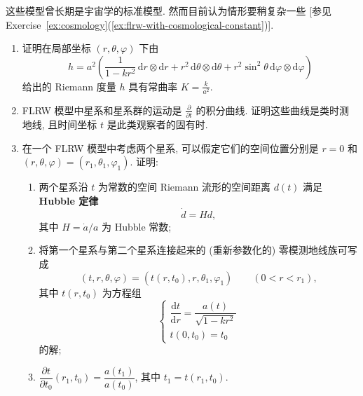这些模型曾长期是宇宙学的标准模型. 然而目前认为情形要稍复杂一些 [参见 Exercise~\ref{ex:cosmology}(\ref{ex:flrw-with-cosmological-constant})].

\begin{RiemannExercise}\label{ex:cosmology}
\begin{enumerate}[label=(\arabic*),ref=\arabic*,leftmargin=*]
\item\label{ex:constant-curvature-of-flrw-spatial-metric}
证明在局部坐标 $(r,\theta,\varphi)$ 下由
\[
  h=a^2\left(\frac{1}{1-kr^2}\,\mathrm{d}r\otimes\mathrm{d}r
     +r^2\,\mathrm{d}\theta\otimes\mathrm{d}\theta
     +r^2\sin^2\theta\,\mathrm{d}\varphi\otimes\mathrm{d}\varphi\right)
\]
给出的 Riemann 度量 $h$ 具有常曲率 $K=\frac{k}{a^2}$.
\item\label{ex:flrw-comoving-observers-are-geodesic}
FLRW 模型中星系和星系群的运动是 $\frac{\partial}{\partial t}$ 的积分曲线. 证明这些曲线是类时测地线, 且时间坐标 $t$ 是此类观察者的固有时.
\item\label{ex:hubble-law-and-cosmological-redshift}
在一个 FLRW 模型中考虑两个星系, 可以假定它们的空间位置分别是 $r=0$ 和 $(r,\theta,\varphi)=(r_1,\theta_1,\varphi_1)$. 证明:
\begin{enumerate}[label=(\alph*),leftmargin=*]
\item 两个星系沿 $t$ 为常数的空间 Riemann 流形的空间距离 $d(t)$ 满足 \textbf{Hubble 定律}
\[
  \dot d=Hd,
\]
其中 $H=\dot a/a$ 为 Hubble 常数;
\item 将第一个星系与第二个星系连接起来的 (重新参数化的) 零模测地线族可写成
\[
  (t,r,\theta,\varphi)=(t(r,t_0),r,\theta_1,\varphi_1)\qquad(0<r<r_1),
\]
其中 $t(r,t_0)$ 为方程组
\[
  \begin{cases}
    \dfrac{\mathrm{d}t}{\mathrm{d}r}=\dfrac{a(t)}{\sqrt{1-kr^2}}\\[.5ex]
    t(0,t_0)=t_0
  \end{cases}
\]
的解;
\item $\dfrac{\partial t}{\partial t_0}(r_1,t_0)=\dfrac{a(t_1)}{a(t_0)}$, 其中 $t_1=t(r_1,t_0)$.


\end{enumerate}
\end{enumerate}
\end{RiemannExercise}
